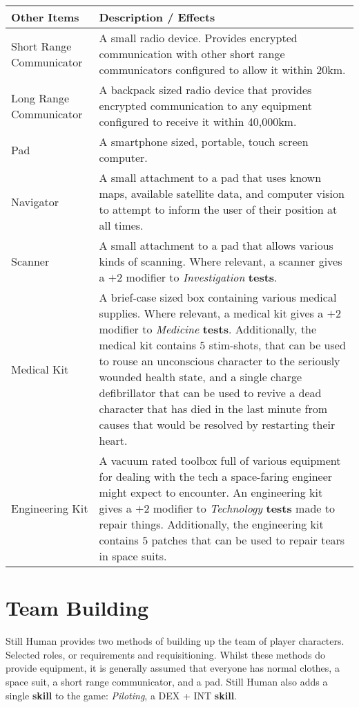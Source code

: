 \documentclass[11pt]{article}
\begin{document}
\begin{multicols}{3}
  \begin{tabularx}{\linewidth}{lX}
    Other Items & Description / Effects \\
    \hline
    Short Range Communicator & A small radio device. Provides encrypted communication with other short range communicators configured to allow it within 20km. \\
    Long Range Communicator & A backpack sized radio device that provides encrypted communication to any equipment configured to receive it within 40,000km. \\
    Pad & A smartphone sized, portable, touch screen computer. \\
    Navigator & A small attachment to a pad that uses known maps, available satellite data, and computer vision to attempt to inform the user of their position at all times. \\
    Scanner & A small attachment to a pad that allows various kinds of scanning. Where relevant, a scanner gives a $+2$ modifier to \textit{Investigation} \textbf{tests}. \\
    Medical Kit & A brief-case sized box containing various medical supplies. Where relevant, a medical kit gives a $+2$ modifier to \textit{Medicine} \textbf{tests}. Additionally, the medical kit contains $5$ stim-shots, that can be used to rouse an unconscious character to the seriously wounded health state, and a single charge defibrillator that can be used to revive a dead character that has died in the last minute from causes that would be resolved by restarting their heart. \\
    Engineering Kit & A vacuum rated toolbox full of various equipment for dealing with the tech a space-faring engineer might expect to encounter. An engineering kit gives a $+2$ modifier to \textit{Technology} \textbf{tests} made to repair things. Additionally, the engineering kit contains $5$ patches that can be used to repair tears in space suits.
  \end{tabularx}

  \section*{Team Building}

  Still Human provides two methods of building up the team of player characters. Selected roles, or requirements and requisitioning. Whilst these methods do provide equipment, it is generally assumed that everyone has normal clothes, a space suit, a short range communicator, and a pad. Still Human also adds a single \textbf{skill} to the game: \textit{Piloting}, a DEX + INT \textbf{skill}.


\end{multicols}
\end{document}
